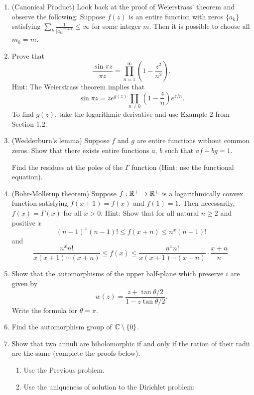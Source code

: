 \documentclass[letterpaper, 12pt]{article}
\begin{document}
\begin{enumerate}
    \item
    (Canonical Product) Look back at the proof of Weierstrass' theorem and observe the following: Suppose \(f(z)\) is an entire function with zeros \(\{a_k\}\) satisfying \(\sum_k \frac{1}{|a_k|^{m+1}} \leq \infty\) for some integer \(m\). Then it is possible to choose all \(m_k = m\).

    \item
    Prove that 
    \[\frac{\sin{\pi z}}{\pi z} = \prod_{n=1}^\infty \left(1 - \frac{z^2}{n^2}\right).\]
    Hint: The Weierstrass theorem implies that 
    \[ \sin{\pi z} = z e^{g(z)} \prod_{n \neq 0} \left(1 - \frac{z}{n}\right) e^{z/n}.\]
    To find \(g(z)\), take the logarithmic derivative and use Example 2 from Section 1.2.

    \item
    (Wedderburn's lemma) Suppose \(f\) and \(g\) are entire functions without common zeros. Show that there exists entire functions \(a\), \(b\) such that \(a f + b g = 1\).

    Find the residues at the poles of the \(\Gamma\) function (Hint: use the functional equation).

    \item
    (Bohr-Mollerup theorem) Suppose \(f: \mathbb{R}^+ \to \mathbb{R}^+\) is a logarithmically convex function satisfying \(f(x+1) = f(x)\) and \(f(1) = 1\). Then necessarily, \(f(x) = \Gamma(x)\) for all \(x > 0\).
    Hint: Show that for all natural \(n \geq 2\) and positive \(x\)
    \[(n-1)^x(n-1)! \leq f(x+ n) \leq n^x(n-1)!\]
    and
    \[\frac{n^x n!}{x(x+1) \cdots (x+n)} \leq f(x) \leq \frac{n^x n!}{x(x+1) \cdots (x+n)} \cdot \frac{x+n}{n}.\]
    
    \item
    Show that the automorphisms of the upper half-plane which preserve \(i\) are given by 
    \[w(z) = \frac{z+ \tan{\theta/2}}{1 - z \tan{\theta/2}}.\]
    Write the formula for \(\theta = \pi\).

    \item
    Find the automorphism group of \(\mathbb{C} \setminus \{0\}\).
    
    \item
    Show that two annuli are biholomorphic if and only if the ration of their radii are the same (complete the proofs below).
    \begin{enumerate}
        \item Use the Previous problem.
        \item Use the uniqueness of solution to the Dirichlet problem: 
    \end{enumerate}


\end{enumerate}
\end{document}
